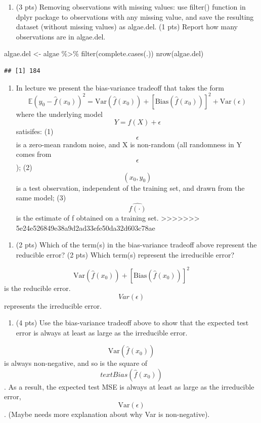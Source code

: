 \documentclass[
]{article}
\newenvironment{Shaded}{\begin{snugshade}}{\end{snugshade}}
\newcommand{\FunctionTok}[1]{\textcolor[rgb]{0.00,0.00,0.00}{#1}}
\newcommand{\NormalTok}[1]{#1}
\newcommand{\OtherTok}[1]{\textcolor[rgb]{0.56,0.35,0.01}{#1}}
\newcommand{\SpecialCharTok}[1]{\textcolor[rgb]{0.00,0.00,0.00}{#1}}
\providecommand{\tightlist}{%
  \setlength{\itemsep}{0pt}\setlength{\parskip}{0pt}}
\begin{document}
\begin{enumerate}
\def\labelenumi{\alph{enumi}.}
\setcounter{enumi}{1}
\tightlist
\item
  (3 pts) Removing observations with missing values: use filter()
  function in dplyr package to observations with any missing value, and
  save the resulting dataset (without missing values) as algae.del. (1
  pts) Report how many observations are in algae.del.
\end{enumerate}

\begin{Shaded}
\begin{Highlighting}[]
\NormalTok{algae.del }\OtherTok{\textless{}{-}}\NormalTok{ algae }\SpecialCharTok{\%\textgreater{}\%} \FunctionTok{filter}\NormalTok{(}\FunctionTok{complete.cases}\NormalTok{(.))}
\FunctionTok{nrow}\NormalTok{(algae.del)}
\end{Highlighting}
\end{Shaded}

\begin{verbatim}
## [1] 184
\end{verbatim}

\begin{enumerate}
\def\labelenumi{\arabic{enumi}.}
\setcounter{enumi}{3}
\tightlist
\item
  In lecture we present the bias-variance tradeoff that takes the form
  \[\mathbb{E}(y_0-\hat{f}(x_0))^2 = \text{Var}(\hat{f}(x_0))+[\text{Bias}(\hat{f}(x_0))]^2+\text{Var}(\epsilon)\]
  where the underlying model \[Y = f(X) + \epsilon\] satisifes: (1)
  \[\epsilon\] is a zero-mean random noise, and X is non-random (all
  randomness in Y comes from \[\epsilon\]); (2) \[(x_0, y_0)\] is a test
  observation, independent of the training set, and drawn from the same
  model; (3) \[\hat{f(\cdot)}\] is the estimate of f obtained on a
  training set.
  \textgreater\textgreater\textgreater\textgreater\textgreater\textgreater\textgreater{}
  5e24e526849e38a9d2ad33efe50da32d603c78ae
\end{enumerate}

\begin{enumerate}
\def\labelenumi{\alph{enumi}.}
\tightlist
\item
  (2 pts) Which of the term(s) in the bias-variance tradeoff above
  represent the reducible error? (2 pts) Which term(s) represent the
  irreducible error?
\end{enumerate}

\[\text{Var}(\hat{f}(x_0))+[\text{Bias}(\hat{f}(x_0))]^2\] is the
reducible error. \[Var(\epsilon)\] represents the irreducible error.

\begin{enumerate}
\def\labelenumi{\alph{enumi}.}
\setcounter{enumi}{1}
\tightlist
\item
  (4 pts) Use the bias-variance tradeoff above to show that the expected
  test error is always at least as large as the irreducible error.
\end{enumerate}

\[\text{Var}(\hat{f}(x_0))\] is always non-negative, and so is the
square of \[text{Bias}(\hat{f}(x_0))\]. As a result, the expected test
MSE is always at least as large as the irreducible error,
\[\text{Var}(\epsilon)\]. (Maybe needs more explanation about why Var is
non-negative).
\end{document}
